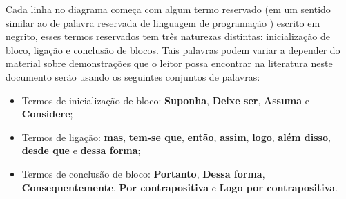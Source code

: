 Cada linha no diagrama começa com algum termo reservado (em um sentido similar ao de palavra reservada de linguagem de programação \cite{aho2007, cooper2017}) escrito em negrito, esses termos reservados tem três naturezas distintas: inicialização de bloco, ligação e conclusão de blocos. Tais palavras podem variar a depender do material sobre demonstrações que o leitor possa encontrar na literatura neste documento serão usando os seguintes conjuntos de palavras:

\begin{itemize}
	\item Termos de inicialização de bloco: \textbf{Suponha}, \textbf{Deixe ser}, \textbf{Assuma} e \textbf{Considere};
	\item Termos de ligação: \textbf{mas}, \textbf{tem-se que}, \textbf{então}, \textbf{assim}, \textbf{logo}, \textbf{além disso}, \textbf{desde que} e \textbf{dessa forma};
  \item Termos de conclusão de bloco: \textbf{Portanto}, \textbf{Dessa forma}, \textbf{Consequentemente}, \textbf{Por contrapositiva} e \textbf{Logo por contrapositiva}.
\end{itemize}

